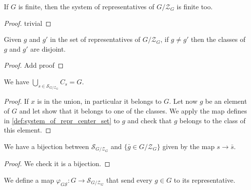 \begin{proposition}
    \label{prop:system_of_repr_center_set_finite}
    \leanok
    If $G$ is finite, then the system of representatives of $G/\mathcal{Z}_G$ is finite too.
\end{proposition}
\begin{proof}
    \leanok
    trivial
\end{proof}

\begin{proposition}
    \label{prop:system_of_repr_center_set_classes_disjoints}
    \leanok
    Given $g$ and $g'$ in the set of representatives of $G/\mathcal{Z}_G$, if $g\ne g'$
    then the classes of $g$ and $g'$ are disjoint.
\end{proposition}
\begin{proof}
    Add proof
\end{proof}

\begin{proposition}
    \label{prop:system_of_repr_center_set_union}
    \leanok
    We have $\bigcup\limits_{s\in \mathcal{S}_{G/\mathcal{Z}_G}} C_s= G$.
\end{proposition}
\begin{proof}
    \leanok
    If $x$ is in the union, in particular it belongs to $G$. Let now $g$ be an element of $G$
    and let show that it belongs to one of the classes. We apply the map defines in \ref{def:system_of_repr_center_set}
    to $g$ and check that $g$ belongs to the class of this element.
\end{proof}

\begin{proposition}
    \label{def:system_of_repr_center_set_bij}
    \leanok
    We have a bijection between $\mathcal{S}_{G/\mathcal{Z}_G}$ and $\{\bar{g} \in G/\mathcal{Z}_G\}$
    given by the map $s\to \bar{s}$.
\end{proposition}
\begin{proof}
    \leanok
    We check it is a bijection.
\end{proof}

\begin{definition}
    \label{def:G_to_syst}
    \leanok
    We define a map $\varphi_{G\mathcal{S}} : G \rightarrow \mathcal{S}_{G/\mathcal{Z}_G}$ that
    send every $g\in G$ to its representative.
\end{definition}

